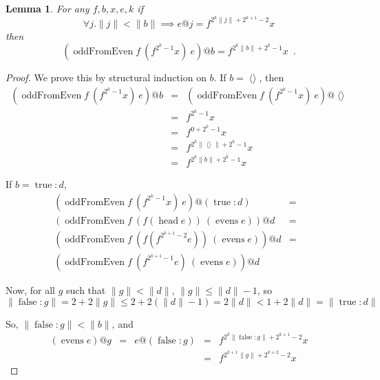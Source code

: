 \documentclass[envcountsect]{llncs}
\DeclareMathOperator{\oddFrom}{oddFromEven}
\DeclareMathOperator{\nil}{\langle\rangle}
\DeclareMathOperator{\true}{true}
\DeclareMathOperator{\false}{false}
\DeclareMathOperator{\head}{head}
\DeclareMathOperator{\evens}{evens}
\newcommand{\ord}[1]{\|#1\|}
\newcommand{\cons}[2]{#1:#2}
\newtheorem{lemma}[theorem]{Lemma}
\begin{document}
\begin{lemma}\label{oddFromLemma}
For any $f, b, x, e, k$
if
\begin{displaymath}
\forall j . \ord{j} < \ord{b} \implies e@j = f^{2^k\ord{j}+2^{k+1}-2}x
\end{displaymath}
then
\begin{displaymath}
(\oddFrom f\ (f^{2^k-1}x)\ e)@b = f^{2^k\ord{b}+2^k-1}x\enspace.
\end{displaymath}
\end{lemma}
\begin{proof}
We prove this by structural induction on $b$. If $b = \nil$, then 
\begin{displaymath}
\begin{array}{rcl}
(\oddFrom f\ (f^{2^k-1}x)\ e)@b & = & (\oddFrom f\ (f^{2^k-1}x)\ e)@\nil \\
& = & f^{2^k-1}x \\
& = & f^{0+2^k-1}x \\
& = & f^{2^k\ord{\nil}+2^k-1}x \\
& = & f^{2^k\ord{b}+2^k-1}x
\end{array}
\end{displaymath}

If $b = \cons{\true}{d}$,
\begin{displaymath}
\begin{array}{rcl}
(\oddFrom f\ (f^{2^k-1}x)\ e)@(\cons{\true}{d})& = & \\
(\oddFrom f\ (f (\head e))\ (\evens e))@d& = & \\
(\oddFrom f\ (f (f^{2^{k+1}-2}e))\ (\evens e))@d& = & \\
(\oddFrom f\ (f^{2^{k+1}-1}e)\ (\evens e))@d&  & 
\end{array}
\end{displaymath}

Now, for all $g$ such that $\ord{g} < \ord{d}$, $\ord{g} \leq \ord{d}-1$, so 
\begin{displaymath}
\ord{\cons{\false}{g}} = 2 + 2\ord{g} \leq 2 + 2(\ord{d} -1) = 2\ord{d} < 1+2\ord{d} = \ord{\cons{\true}{d}}
\end{displaymath}

So, $\ord{\cons{\false}{g}} < \ord{b}$, and 
\begin{displaymath}
\begin{array}{rcccl}
(\evens e)@g & = & e@(\cons{\false}{g}) & = & f^{2^k\ord{\cons{\false}{g}}+2^{k+1}-2}x \\
& & & = & f^{2^{k+1}\ord{g}+2^{k+2}-2}x 
\end{array}
\end{displaymath}


\end{proof}
\end{document}
